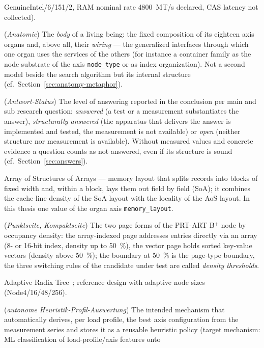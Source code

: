 \begin{description}
  GenuineIntel/6/151/2, RAM nominal rate 4800~MT/s declared, CAS latency not collected).
  \item[Anatomy] (\emph{Anatomie}) The \emph{body} of a living being: the fixed composition of its
  eighteen axis organs and, above all, their \emph{wiring} --- the generalized interfaces through
  which one organ uses the services of the others (for instance a container family as the node
  substrate of the axis \texttt{node\_type} or as index organization). Not a second model beside
  the search algorithm but its internal structure (cf.\ Section~\ref{sec:anatomy-metaphor}).
  \item[Answer status] (\emph{Antwort-Status}) The level of answering reported in the conclusion
  per main and sub research question: \emph{answered} (a test or a measurement substantiates the
  answer), \emph{structurally answered} (the apparatus that delivers the answer is implemented and
  tested, the measurement is not available) or \emph{open} (neither structure nor measurement is
  available). Without measured values and concrete evidence a question counts as not answered,
  even if its structure is sound (cf.\ Section~\ref{sec:answers}).
  \item[AoSoA] Array of Structures of Arrays --- memory layout that splits records into blocks of
  fixed width and, within a block, lays them out field by field (SoA); it combines the cache-line
  density of the SoA layout with the locality of the AoS layout. In this thesis one value of the
  organ axis \texttt{memory\_layout}.
  \item[Array-indexed page, vector page] (\emph{Punktseite, Kompaktseite}) The two page forms of
  the PRT-ART B$^+$ node by occupancy density: the array-indexed page addresses entries directly
  via an array (8- or 16-bit index, density up to 50~\%), the vector page holds sorted key-value
  vectors (density above 50~\%); the boundary at 50~\% is the page-type boundary, the three
  switching rules of the candidate under test are called \emph{density thresholds}.
  \item[ART] Adaptive Radix Tree~\cite{leis2013art}; reference design with adaptive node sizes
  (Node4/16/48/256).
  \item[Autonomous profile-driven heuristic evaluation]
  (\emph{autonome Heuristik-Profil-Auswertung}) The intended mechanism that automatically derives,
  per load profile, the best axis configuration from the measurement series and stores it as a
  reusable heuristic policy (target mechanism: ML classification of load-profile/axis features onto

\end{description}
